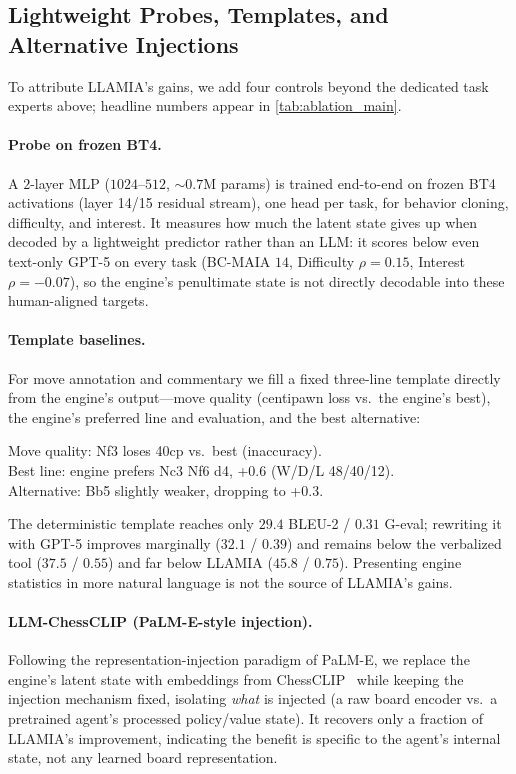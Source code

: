 \subsection{Lightweight Probes, Templates, and Alternative Injections}
\label{sec:app_baselines_probe}

To attribute LLAMIA's gains, we add four controls beyond the dedicated task experts above; headline numbers appear in \cref{tab:ablation_main}.

\paragraph{Probe on frozen BT4.} A $2$-layer MLP ($1024$--$512$, ${\sim}0.7$M params) is trained end-to-end on frozen BT4 activations (layer 14/15 residual stream), one head per task, for behavior cloning, difficulty, and interest. It measures how much the latent state gives up when decoded by a lightweight predictor rather than an LLM: it scores below even text-only GPT-5 on every task (BC-MAIA $14$, Difficulty $\rho{=}0.15$, Interest $\rho{=}{-}0.07$), so the engine's penultimate state is not directly decodable into these human-aligned targets.

\paragraph{Template baselines.} For move annotation and commentary we fill a fixed three-line template directly from the engine's output---move quality (centipawn loss vs.\ the engine's best), the engine's preferred line and evaluation, and the best alternative:
\begin{quoting}\small\ttfamily
Move quality: Nf3 loses 40cp vs.\ best (inaccuracy).\\
Best line: engine prefers Nc3 Nf6 d4, +0.6 (W/D/L 48/40/12).\\
Alternative: Bb5 slightly weaker, dropping to +0.3.
\end{quoting}
The deterministic template reaches only $29.4$ BLEU-2 / $0.31$ G-eval; rewriting it with GPT-5 improves marginally ($32.1$ / $0.39$) and remains below the verbalized tool ($37.5$ / $0.55$) and far below LLAMIA ($45.8$ / $0.75$). Presenting engine statistics in more natural language is not the source of LLAMIA's gains.

\paragraph{LLM-ChessCLIP (PaLM-E-style injection).} Following the representation-injection paradigm of PaLM-E, we replace the engine's latent state with embeddings from ChessCLIP~\cite{feng2024chessgpt} while keeping the injection mechanism fixed, isolating \emph{what} is injected (a raw board encoder vs.\ a pretrained agent's processed policy/value state). It recovers only a fraction of LLAMIA's improvement, indicating the benefit is specific to the agent's internal state, not any learned board representation.

